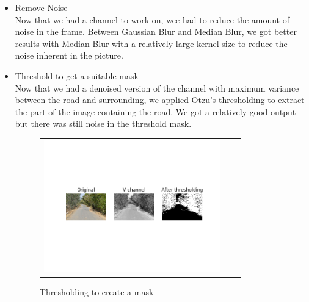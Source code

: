 \documentclass[12pt,a4paper]{article}
\begin{document}
\begin{itemize}
\begin{figure}[!ht]
\begin{center}
\end{center}
\end{figure}

%     

\newpage
\item Remove Noise \\
    Now that we had a channel to work on, wee had to reduce the amount of noise in the frame. Between Gaussian Blur and Median Blur, we got better results with Median Blur with a relatively large kernel size to reduce the noise inherent in the picture. 

\item Threshold to get a suitable mask \\
    Now that we had a denoised version of the channel with maximum variance between the road and surrounding, we applied Otzu's thresholding to extract the part of the image containing the road. We got a relatively good output but there was still noise in the threshold mask.

\begin{figure}[!ht]
\begin{center}

\begin{tabular}{ccc}
\centering
\includegraphics[width = 3in]{images/otzu.png}
\end{tabular}
\caption{Thresholding to create a mask}


\end{center}
\end{figure}
\end{itemize}
\end{document}

